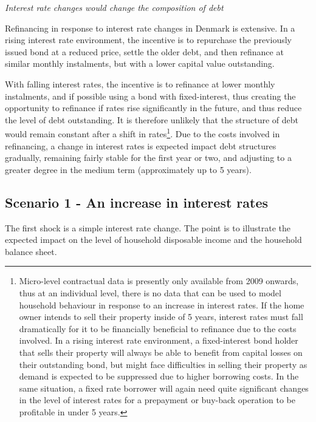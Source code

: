 \documentclass[
]{book}
\begin{document}
\emph{Interest rate changes would change the composition of debt}

Refinancing in response to interest rate changes in Denmark is extensive. In a rising interest rate environment, the incentive is to repurchase the previously issued bond at a reduced price, settle the older debt, and then refinance at similar monthly instalments, but with a lower capital value outstanding.

With falling interest rates, the incentive is to refinance at lower monthly instalments, and if possible using a bond with fixed-interest, thus creating the opportunity to refinance if rates rise significantly in the future, and thus reduce the level of debt outstanding. It is therefore unlikely that the structure of debt would remain constant after a shift in rates\footnote{Micro-level contractual data is presently only available from 2009 onwards, thus at an individual level, there is no data that can be used to model household behaviour in response to an increase in interest rates. If the home owner intends to sell their property inside of 5 years, interest rates must fall dramatically for it to be financially beneficial to refinance due to the costs involved. In a rising interest rate environment, a fixed-interest bond holder that sells their property will always be able to benefit from capital losses on their outstanding bond, but might face difficulties in selling their property as demand is expected to be suppressed due to higher borrowing costs. In the same situation, a fixed rate borrower will again need quite significant changes in the level of interest rates for a prepayment or buy-back operation to be profitable in under 5 years.}. Due to the costs involved in refinancing, a change in interest rates is expected impact debt structures gradually, remaining fairly stable for the first year or two, and adjusting to a greater degree in the medium term (approximately up to 5 years).

\hypertarget{sec:fi-fl-sfc-scenarios-s1}{%
\subsection{Scenario 1 - An increase in interest rates}\label{sec:fi-fl-sfc-scenarios-s1}}

The first shock is a simple interest rate change. The point is to illustrate the expected impact on the level of household disposable income and the household balance sheet.
\end{document}
